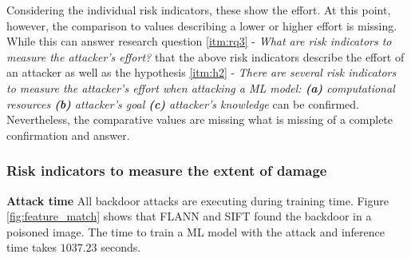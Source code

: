 Considering the individual risk indicators, these show the effort. At this point, however, the comparison to values describing a lower or higher effort is missing. While this can answer research question \ref{itm:rq3} - \textit{What are risk indicators to measure the attacker's effort?} that the above risk indicators describe the effort of an attacker as well as the hypothesis \ref{itm:h2} - \textit{There are several risk indicators to measure the attacker's effort when attacking a ML model: \textbf{(a)} computational resources \textbf{(b)} attacker's goal \textbf{(c)} attacker's knowledge} can be confirmed. Nevertheless, the comparative values are missing what is missing of a complete confirmation and answer.

\subsubsection*{Risk indicators to measure the extent of damage}

\noindent\textbf{Attack time} All backdoor attacks are executing during training time. Figure \ref{fig:feature_match} shows that FLANN and SIFT found the backdoor in a poisoned image. The time to train a ML model with the attack and inference time takes $1037.23$ seconds.

